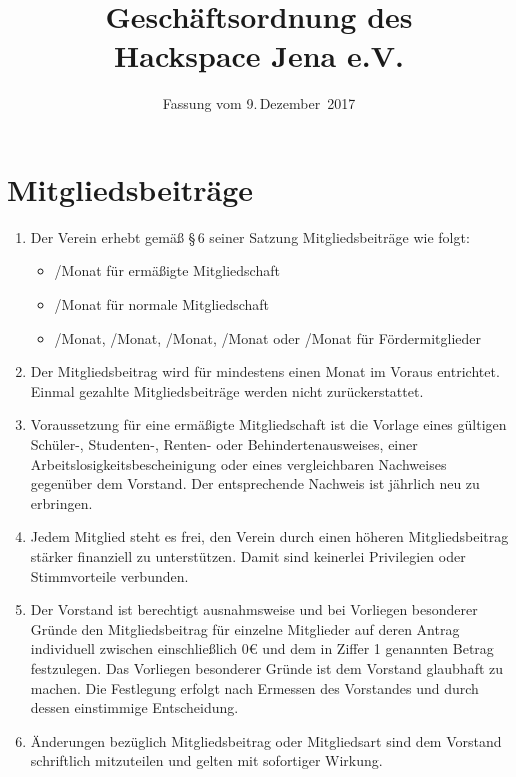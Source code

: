 \documentclass[fontsize=12pt,paper=a4,pagesize,headings=small]{scrartcl}
\title{Geschäftsordnung des \\ Hackspace Jena e.V.}
\date{Fassung vom 9.\,Dezember~2017}
\begin{document}
\maketitle{}

\section{Mitgliedsbeiträge}

\begin{enumerate}
    \item Der Verein erhebt gemäß §\,6 seiner Satzung Mitgliedsbeiträge wie
        folgt:
        \begin{itemize}
            \item {}/Monat für ermäßigte Mitgliedschaft
            \item {}/Monat für normale Mitgliedschaft
            \item {}/Monat, /Monat, /Monat,
                  /Monat oder /Monat für
                  Fördermitglieder
        \end{itemize}

    \item Der Mitgliedsbeitrag wird für mindestens einen Monat im Voraus
        entrichtet. Einmal gezahlte Mitgliedsbeiträge werden nicht
        zurückerstattet.

    \item Voraussetzung für eine ermäßigte Mitgliedschaft ist die Vorlage
        eines gültigen Schüler-, Studenten-, Renten- oder
        Behindertenausweises, einer Arbeitslosigkeitsbescheinigung oder
        eines vergleichbaren Nachweises gegenüber dem Vorstand. Der
        entsprechende Nachweis ist jährlich neu zu erbringen.

    \item Jedem Mitglied steht es frei, den Verein durch einen höheren
        Mitgliedsbeitrag stärker finanziell zu unterstützen. Damit sind
        keinerlei Privilegien oder Stimmvorteile verbunden.
        
    \item Der Vorstand ist berechtigt ausnahmsweise und bei Vorliegen 
        besonderer Gründe den Mitgliedsbeitrag für einzelne Mitglieder 
        auf deren Antrag individuell zwischen einschließlich 0\euro{} 
        und dem in Ziffer 1 genannten Betrag festzulegen. Das Vorliegen
        besonderer Gründe ist dem Vorstand glaubhaft zu machen. Die 
        Festlegung erfolgt nach Ermessen des Vorstandes und durch dessen 
        einstimmige Entscheidung.

    \item Änderungen bezüglich Mitgliedsbeitrag oder Mitgliedsart sind dem
        Vorstand schriftlich mitzuteilen und gelten mit sofortiger Wirkung.
\end{enumerate}
\end{document}
